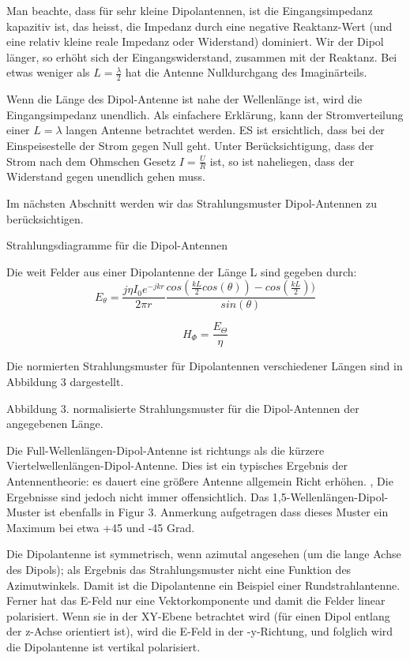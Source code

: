 Man beachte, dass für sehr kleine Dipolantennen, ist die Eingangsimpedanz kapazitiv ist, das heisst, die Impedanz durch eine negative Reaktanz-Wert (und eine relativ kleine reale Impedanz oder Widerstand) dominiert. Wir der Dipol länger, so erhöht sich der Eingangswiderstand, zusammen mit der Reaktanz. Bei etwas weniger als $L=\frac{\lambda}{2}$ hat die Antenne Nulldurchgang des Imaginärteils.

Wenn die Länge des Dipol-Antenne ist nahe der Wellenlänge ist, wird die Eingangsimpedanz unendlich. Als einfachere Erklärung, kann der Stromverteilung einer $L = \lambda$ langen Antenne betrachtet werden. ES ist ersichtlich, dass bei der Einspeisestelle der Strom gegen Null geht. Unter Berücksichtigung, dass der Strom nach dem Ohmschen Gesetz $I = \frac{U}{R}$ ist, so ist naheliegen, dass der Widerstand gegen unendlich gehen muss. 

Im nächsten Abschnitt werden wir das Strahlungsmuster Dipol-Antennen zu berücksichtigen.


Strahlungsdiagramme für die Dipol-Antennen

Die weit Felder aus einer Dipolantenne der Länge L sind gegeben durch:
\[E_{\theta}=\frac{j\eta I_{0} e^{-jkr}}{2\pi r}\frac{cos(\frac{kL}{2}cos(\theta))-cos(\frac{kL}{2}))}{sin(\theta)}\]

\[H_{\Phi}=\frac{E_{\Theta}}{\eta}\]

Die normierten Strahlungsmuster für Dipolantennen verschiedener Längen sind in Abbildung 3 dargestellt.


Abbildung 3. normalisierte Strahlungsmuster für die Dipol-Antennen der angegebenen Länge.

Die Full-Wellenlängen-Dipol-Antenne ist richtungs als die kürzere Viertelwellenlängen-Dipol-Antenne. Dies ist ein typisches Ergebnis der Antennentheorie: es dauert eine größere Antenne allgemein Richt erhöhen. , Die Ergebnisse sind jedoch nicht immer offensichtlich. Das 1,5-Wellenlängen-Dipol-Muster ist ebenfalls in Figur 3. Anmerkung aufgetragen dass dieses Muster ein Maximum bei etwa +45 und -45 Grad.

Die Dipolantenne ist symmetrisch, wenn azimutal angesehen (um die lange Achse des Dipols); als Ergebnis das Strahlungsmuster nicht eine Funktion des Azimutwinkels. Damit ist die Dipolantenne ein Beispiel einer Rundstrahlantenne. Ferner hat das E-Feld nur eine Vektorkomponente und damit die Felder linear polarisiert. Wenn sie in der XY-Ebene betrachtet wird (für einen Dipol entlang der z-Achse orientiert ist), wird die E-Feld in der -y-Richtung, und folglich wird die Dipolantenne ist vertikal polarisiert.

